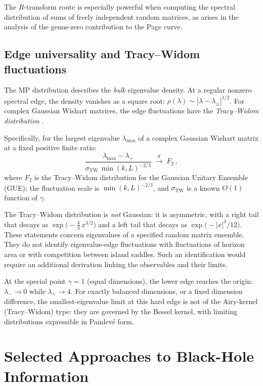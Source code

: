\documentclass[11pt,letterpaper]{article}
\theoremstyle{plain}
\theoremstyle{definition}
\theoremstyle{remark}
\begin{document}
The $R$-transform route is especially powerful when computing the spectral
distribution of sums of freely independent random matrices, as arises in the
analysis of the genus-zero contribution to the Page curve.

\subsection{Edge universality and Tracy--Widom fluctuations}

The MP distribution describes the \emph{bulk} eigenvalue density.  At a regular nonzero
spectral edge, the density vanishes as a square root:
$\rho(\lambda) \sim |\lambda - \lambda_{\pm}|^{1/2}$.  For complex Gaussian Wishart matrices, the edge fluctuations
have the \emph{Tracy--Widom distribution} \cite{tracywidom1994}.

Specifically, for the largest eigenvalue $\lambda_{\max}$ of a complex Gaussian
Wishart matrix at a fixed positive finite ratio:
\begin{equation}
  \frac{\lambda_{\max} - \lambda_{+}}
  {\sigma_{\mathrm{TW}}\,\min(k,L)^{-2/3}}
  \;\xrightarrow{\;d\;}\; F_2\,,
  \label{eq16:tracy_widom}
\end{equation}
where $F_2$ is the Tracy--Widom distribution for the Gaussian Unitary Ensemble
(GUE); the fluctuation scale is $\min(k,L)^{-2/3}$, and
$\sigma_{\mathrm{TW}}$ is a known $O(1)$ function of $\gamma$.

The Tracy--Widom distribution is \emph{not} Gaussian: it is asymmetric, with a
right tail that decays as $\exp\!\bigl(-\tfrac{4}{3}\,x^{3/2}\bigr)$ and a
left tail that decays as $\exp\!\bigl(-|x|^{3}/12\bigr)$.  These statements concern eigenvalues of a specified random matrix ensemble.
They do not identify eigenvalue-edge fluctuations with fluctuations of horizon
area or with competition between island saddles.  Such an identification would
require an additional derivation linking the observables and their limits.

At the special point $\gamma = 1$ (equal dimensions), the lower edge reaches the
origin: $\lambda_{-} \to 0$ while $\lambda_{+} \to 4$.  For exactly balanced dimensions, or a fixed dimension difference, the
smallest-eigenvalue limit at this hard edge is not of the
Airy-kernel (Tracy--Widom) type: they are governed by the Bessel kernel, with
limiting distributions expressible in Painlev\'e form.


\section{Selected Approaches to Black-Hole Information}
\label{app:proposals}
\end{document}

